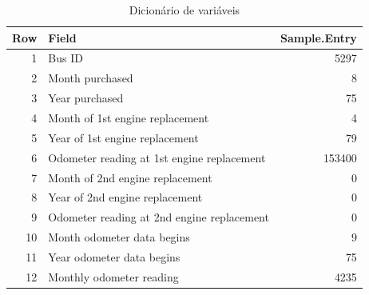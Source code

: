 \documentclass[12pt,a4paper]{article}
\newenvironment{Shaded}{\begin{snugshade}}{\end{snugshade}}
\newcommand{\CommentTok}[1]{\textcolor[rgb]{0.56,0.35,0.01}{\textit{#1}}}
\newcommand{\DataTypeTok}[1]{\textcolor[rgb]{0.13,0.29,0.53}{#1}}
\newcommand{\DecValTok}[1]{\textcolor[rgb]{0.00,0.00,0.81}{#1}}
\newcommand{\KeywordTok}[1]{\textcolor[rgb]{0.13,0.29,0.53}{\textbf{#1}}}
\newcommand{\NormalTok}[1]{#1}
\newcommand{\OperatorTok}[1]{\textcolor[rgb]{0.81,0.36,0.00}{\textbf{#1}}}
\newcommand{\OtherTok}[1]{\textcolor[rgb]{0.56,0.35,0.01}{#1}}
\newcommand{\StringTok}[1]{\textcolor[rgb]{0.31,0.60,0.02}{#1}}
\begin{document}
\begin{Shaded}
\end{Shaded}

\begin{table}[ht]
\centering
\begin{tabular}{rlr}
  \hline
Row & Field & Sample.Entry \\ 
  \hline
1 & Bus ID & 5297 \\ 
  2 & Month purchased & 8 \\ 
  3 & Year purchased & 75 \\ 
  4 & Month of 1st engine replacement & 4 \\ 
  5 & Year of 1st engine replacement & 79 \\ 
  6 & Odometer reading at 1st engine replacement & 153400 \\ 
  7 & Month of 2nd engine replacement & 0 \\ 
  8 & Year of 2nd engine replacement & 0 \\ 
  9 & Odometer reading at 2nd engine replacement & 0 \\ 
  10 & Month odometer data begins & 9 \\ 
  11 & Year odometer data begins & 75 \\ 
  12 & Monthly odometer reading & 4235 \\ 
   \hline
\end{tabular}
\caption{Dicionário de variáveis} 
\end{table}
\end{document}
